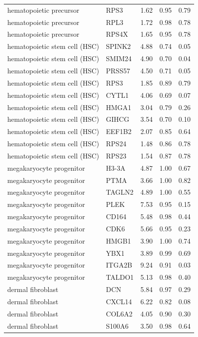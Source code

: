 \begin{longtable}{llccc}
hematopoietic precursor & RPS3 & 1.62 & 0.95 & 0.79 \\
hematopoietic precursor & RPL3 & 1.72 & 0.98 & 0.78 \\
hematopoietic precursor & RPS4X & 1.65 & 0.95 & 0.78 \\
hematopoietic stem cell (HSC) & SPINK2 & 4.88 & 0.74 & 0.05 \\
hematopoietic stem cell (HSC) & SMIM24 & 4.90 & 0.70 & 0.04 \\
hematopoietic stem cell (HSC) & PRSS57 & 4.50 & 0.71 & 0.05 \\
hematopoietic stem cell (HSC) & RPS3 & 1.85 & 0.89 & 0.79 \\
hematopoietic stem cell (HSC) & CYTL1 & 4.06 & 0.69 & 0.07 \\
hematopoietic stem cell (HSC) & HMGA1 & 3.04 & 0.79 & 0.26 \\
hematopoietic stem cell (HSC) & GIHCG & 3.54 & 0.70 & 0.10 \\
hematopoietic stem cell (HSC) & EEF1B2 & 2.07 & 0.85 & 0.64 \\
hematopoietic stem cell (HSC) & RPS24 & 1.48 & 0.86 & 0.78 \\
hematopoietic stem cell (HSC) & RPS23 & 1.54 & 0.87 & 0.78 \\
megakaryocyte progenitor & H3-3A & 4.87 & 1.00 & 0.67 \\
megakaryocyte progenitor & PTMA & 3.66 & 1.00 & 0.82 \\
megakaryocyte progenitor & TAGLN2 & 4.89 & 1.00 & 0.55 \\
megakaryocyte progenitor & PLEK & 7.53 & 0.95 & 0.15 \\
megakaryocyte progenitor & CD164 & 5.48 & 0.98 & 0.44 \\
megakaryocyte progenitor & CDK6 & 5.66 & 0.95 & 0.23 \\
megakaryocyte progenitor & HMGB1 & 3.90 & 1.00 & 0.74 \\
megakaryocyte progenitor & YBX1 & 3.89 & 0.99 & 0.69 \\
megakaryocyte progenitor & ITGA2B & 9.24 & 0.91 & 0.03 \\
megakaryocyte progenitor & TALDO1 & 5.13 & 0.98 & 0.40 \\
dermal fibroblast & DCN & 5.84 & 0.97 & 0.29 \\
dermal fibroblast & CXCL14 & 6.22 & 0.82 & 0.08 \\
dermal fibroblast & COL6A2 & 4.05 & 0.90 & 0.30 \\
dermal fibroblast & S100A6 & 3.50 & 0.98 & 0.64 \\

\end{longtable}

